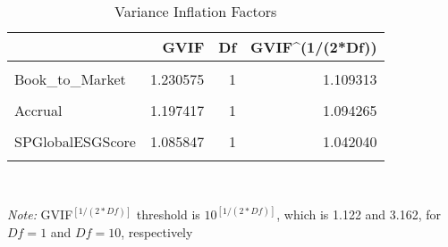 
\begin{table}[!h]

\caption{Variance Inflation Factors}
\centering
\begin{threeparttable}
\begin{tabular}[t]{lrrr}
\toprule
  & GVIF & Df & GVIF\textasciicircum{}(1/(2*Df))\\
\midrule
\cellcolor{gray!6}{Market\_Cap} & \cellcolor{gray!6}{1.129371} & \cellcolor{gray!6}{1} & \cellcolor{gray!6}{1.062719}\\
Book\_to\_Market & 1.230575 & 1 & 1.109313\\
\cellcolor{gray!6}{Shares\_Turnover} & \cellcolor{gray!6}{1.119235} & \cellcolor{gray!6}{1} & \cellcolor{gray!6}{1.057939}\\
Accrual & 1.197417 & 1 & 1.094265\\
\cellcolor{gray!6}{FF\_Market\_Beta} & \cellcolor{gray!6}{1.019088} & \cellcolor{gray!6}{1} & \cellcolor{gray!6}{1.009499}\\
\addlinespace
SPGlobalESGScore & 1.085847 & 1 & 1.042040\\
\cellcolor{gray!6}{Industry} & \cellcolor{gray!6}{1.539045} & \cellcolor{gray!6}{10} & \cellcolor{gray!6}{1.021792}\\
\bottomrule
\end{tabular}
\begin{tablenotes} 
\item \\
\item \textit{Note: } GVIF$^{[1/(2*Df)]}$ threshold is $10^{[1/(2*Df)]}$, which is 1.122 and 3.162, for $Df = 1$ and $Df= 10$, respectively
\end{tablenotes}
\end{threeparttable}
\end{table}